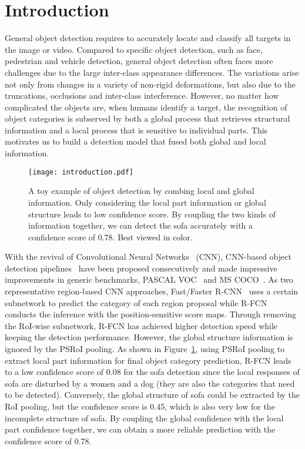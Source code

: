 \documentclass[10pt,twocolumn,letterpaper]{article}
\begin{document}
\section{Introduction}

General object detection requires to accurately locate and classify all targets in the image or video. Compared to specific object detection, such as face, pedestrian and vehicle detection, general object detection often faces more challenges due to the large inter-class appearance differences. The variations arise not only from changes in a variety of non-rigid deformations, but also due to the truncations, occlusions and inter-class interference. However, no matter how complicated the objects are, when humans identify a target, the recognition of object categories is subserved by both a global process that retrieves structural information and a local process that is sensitive to individual parts. This motivates us to build a detection model that fused both global and local information.

\begin{figure}[t]
\begin{center}
\texttt{[image: introduction.pdf]}
\end{center}
  \caption{A toy example of object detection by combing local and global information. Only considering the local part information or global structure leads to low confidence score. By coupling the two kinds of information together, we can detect the sofa accurately with a confidence score of 0.78. Best viewed in color.}
\label{introduction}
\end{figure}

With the revival of Convolutional Neural Networks~\cite{krizhevsky2012imagenet} (CNN), CNN-based object detection pipelines~\cite{girshick2015fast, girshick2014rich, li2016r, ren2015faster} have been proposed consecutively and made impressive improvements in generic benchmarks, \eg PASCAL VOC~\cite{everingham2010pascal} and MS COCO~\cite{lin2014microsoft}. As two representative region-based CNN approaches, Fast/Faster R-CNN~\cite{girshick2015fast, ren2015faster} uses a certain subnetwork to predict the category of each region proposal while R-FCN~\cite{li2016r} conducts the inference with the position-sensitive score maps. Through removing the RoI-wise subnetwork, R-FCN  has achieved higher detection speed while keeping the detection performance. However, the global structure information is ignored by the PSRoI pooling. As shown in Figure~\ref{introduction}, using PSRoI pooling to extract local part information for final object category prediction, R-FCN leads to a low confidence score of 0.08 for the sofa detection since the local responses of sofa are disturbed by a women and a dog (they are also the categories that need to be detected). Conversely, the global structure of sofa could be extracted by the RoI pooling, but the confidence score is 0.45, which is also very low for the incomplete structure of sofa. By coupling the global confidence with the local part confidence together, we can obtain a more reliable prediction with the confidence score of 0.78.
\end{document}
